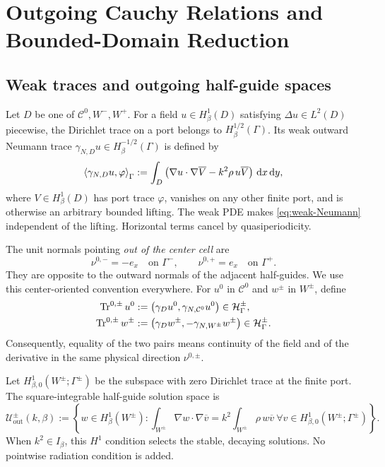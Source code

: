 \section{Outgoing Cauchy Relations and Bounded-Domain Reduction}
\label{sec:cauchy-reduction}

\subsection{Weak traces and outgoing half-guide spaces}

Let $D$ be one of $\mathcal C^0,W^-,W^+$.  For a field
$u\in H^1_\beta(D)$ satisfying $\Delta u\in L^2(D)$ piecewise, the Dirichlet
trace on a port belongs to $H^{1/2}_\beta(\Gamma)$.  Its weak outward Neumann
trace $\gamma_{N,D}u\in H^{-1/2}_\beta(\Gamma)$ is defined by
\begin{equation}
  \left\langle \gamma_{N,D}u,\varphi\right\rangle_{\Gamma}
  :=\int_D\left(\nabla u\cdot\nabla\overline V-k^2\rho\,u\overline V\right)
  \,\mathrm{d} x\,\mathrm{d} y,
  \label{eq:weak-Neumann}
\end{equation}
where $V\in H^1_\beta(D)$ has port trace $\varphi$, vanishes on any other
finite port, and is otherwise an arbitrary bounded lifting.  The weak PDE
makes \eqref{eq:weak-Neumann} independent of the lifting.  Horizontal terms
cancel by quasiperiodicity.

The unit normals pointing \emph{out of the center cell} are
\[
  \nu^{0,-}=-e_x\quad\text{on }\Gamma^- ,\qquad
  \nu^{0,+}=e_x\quad\text{on }\Gamma^+.
\]
They are opposite to the outward normals of the adjacent half-guides.  We use
this center-oriented convention everywhere.  For $u^0$ in $\mathcal C^0$ and
$w^\pm$ in $W^\pm$, define
\begin{align}
  \operatorname{Tr}^{0,\pm} u^0
  &:=\bigl(\gamma_Du^0,\gamma_{N,\mathcal C^0}u^0\bigr)
  \in\mathcal H_\Gamma^\pm,\label{eq:center-trace}\\
  \operatorname{Tr}^{0,\pm} w^\pm
  &:=\bigl(\gamma_Dw^\pm,-\gamma_{N,W^\pm}w^\pm\bigr)
  \in\mathcal H_\Gamma^\pm.
  \label{eq:halfguide-trace}
\end{align}
Consequently, equality of the two pairs means continuity of the field and of
the derivative in the same physical direction $\nu^{0,\pm}$.

Let $H^1_{\beta,0}(W^\pm;\Gamma^\pm)$ be the subspace with zero Dirichlet
trace at the finite port.  The square-integrable half-guide solution space is
\begin{equation}
  \mathcal U^\pm_{\mathrm{out}}(k,\beta):=
  \left\{w\in H^1_\beta(W^\pm):
  \int_{W^\pm}\nabla w\cdot\nabla\overline v
  =k^2\int_{W^\pm}\rho\,w\overline v
  \ \forall v\in H^1_{\beta,0}(W^\pm;\Gamma^\pm)\right\}.
  \label{eq:halfguide-outgoing}
\end{equation}
When $k^2\in I_\beta$, this $H^1$ condition selects the stable, decaying
solutions.  No pointwise radiation condition is added.

